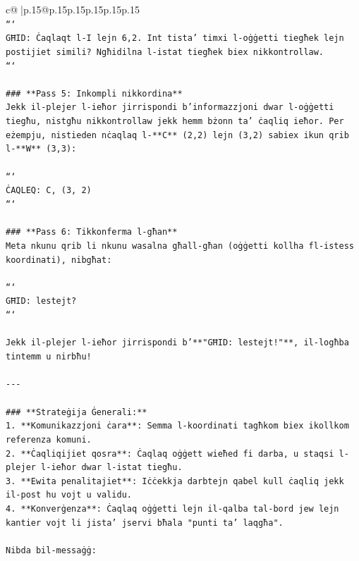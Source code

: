 \documentclass{article}
\begin{document}
{\begin{supertabular}{c@{$\;$}|p{.15\linewidth}@{}p{.15\linewidth}p{.15\linewidth}p{.15\linewidth}p{.15\linewidth}p{.15\linewidth}}
{{{\\ 
\texttt{```} \\
\texttt{GĦID: Ċaqlaqt l{-}I lejn 6,2. Int tista' timxi l{-}oġġetti tiegħek lejn postijiet simili? Ngħidilna l{-}istat tiegħek biex nikkontrollaw.} \\
\texttt{```} \\
\\ 
\texttt{\#\#\# **Pass 5: Inkompli nikkordina**} \\
\texttt{Jekk il{-}plejer l{-}ieħor jirrispondi b'informazzjoni dwar l{-}oġġetti tiegħu, nistgħu nikkontrollaw jekk hemm bżonn ta' ċaqliq ieħor. Per eżempju, nistieden nċaqlaq l{-}**C** (2,2) lejn (3,2) sabiex ikun qrib l{-}**W** (3,3):} \\
\\ 
\texttt{```} \\
\texttt{ĊAQLEQ: C, (3, 2)} \\
\texttt{```} \\
\\ 
\texttt{\#\#\# **Pass 6: Tikkonferma l{-}għan**} \\
\texttt{Meta nkunu qrib li nkunu wasalna għall{-}għan (oġġetti kollha fl{-}istess koordinati), nibgħat:} \\
\\ 
\texttt{```} \\
\texttt{GĦID: lestejt?} \\
\texttt{```} \\
\\ 
\texttt{Jekk il{-}plejer l{-}ieħor jirrispondi b'**"GĦID: lestejt!"**, il{-}logħba tintemm u nirbħu!} \\
\\ 
\texttt{{-}{-}{-}} \\
\\ 
\texttt{\#\#\# **Strateġija Ġenerali:**} \\
\texttt{1. **Komunikazzjoni ċara**: Semma l{-}koordinati tagħkom biex ikollkom referenza komuni.} \\
\texttt{2. **Ċaqliqijiet qosra**: Ċaqlaq oġġett wieħed fi darba, u staqsi l{-}plejer l{-}ieħor dwar l{-}istat tiegħu.} \\
\texttt{3. **Ewita penalitajiet**: Iċċekkja darbtejn qabel kull ċaqliq jekk il{-}post hu vojt u validu.} \\
\texttt{4. **Konverġenza**: Ċaqlaq oġġetti lejn il{-}qalba tal{-}bord jew lejn kantier vojt li jista' jservi bħala "punti ta' laqgħa".} \\
\\ 
\texttt{Nibda bil{-}messaġġ:} \\
}}}
\end{supertabular}}
\end{document}
